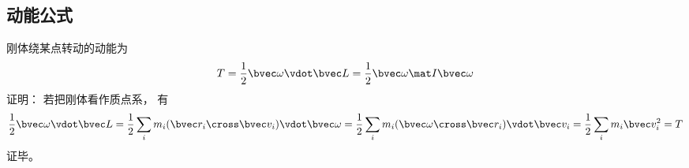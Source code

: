 \subsection{动能公式}
刚体绕某点转动的动能为
\begin{equation}\label{RBKE_eq1}
T = \frac{1}{2}\bvec \omega \vdot \bvec L = \frac{1}{2}\bvec \omega \mat I \bvec\omega
\end{equation}
证明： 若把刚体看作质点系， 有
\begin{equation}
\frac{1}{2}\bvec \omega \vdot \bvec L = \frac{1}{2} \sum_i m_i (\bvec r_i\cross \bvec v_i)\vdot \bvec \omega = \frac{1}{2} \sum_i m_i (\bvec \omega \cross \bvec r_i)\vdot \bvec v_i = \frac{1}{2} \sum_i m_i \bvec v_i^2 = T
\end{equation}
证毕。
